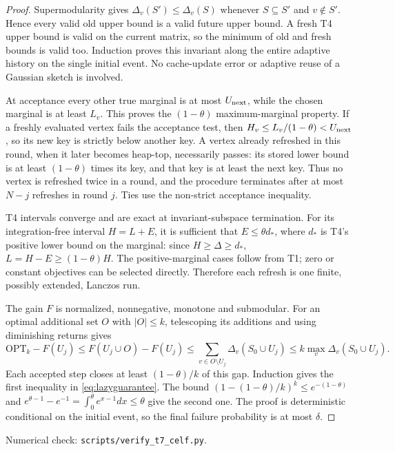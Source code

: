 \documentclass[11pt]{article}
\begin{document}
\begin{proof}
Supermodularity gives
$\Delta_v(S')\leq\Delta_v(S)$ whenever $S\subseteq S'$ and
$v\notin S'$. Hence every valid old upper bound is a valid future
upper bound. A fresh T4 upper bound is valid on the current matrix,
so the minimum of old and fresh bounds is valid too. Induction
proves this invariant along the entire adaptive history on the
single initial event. No cache-update error or adaptive reuse of a
Gaussian sketch is involved.

At acceptance every other true marginal is at most
$U_{\rm next}$, while the chosen marginal is at least $L_v$.
This proves the $(1-\theta)$ maximum-marginal property.
If a freshly evaluated vertex fails the acceptance test, then
$H_v\leq L_v/(1-\theta)<U_{\rm next}$, so its new key is strictly
below another key. A vertex already refreshed in this round, when
it later becomes heap-top, necessarily passes: its stored lower
bound is at least $(1-\theta)$ times its key, and that key is at
least the next key. Thus no vertex is refreshed twice in a round,
and the procedure terminates after at most $N-j$ refreshes in
round $j$. Ties use the non-strict acceptance inequality.

T4 intervals converge and are exact at invariant-subspace
termination. For its integration-free interval $H=L+E$, it is
sufficient that $E\leq\theta d_*$, where $d_*$ is T4's positive
lower bound on the marginal: since $H\geq\Delta\geq d_*$,
$L=H-E\geq(1-\theta)H$. The positive-marginal cases follow from
T1; zero or constant objectives can be selected directly. Therefore
each refresh is one finite, possibly extended, Lanczos run.

The gain $F$ is normalized, nonnegative, monotone and submodular.
For an optimal additional set $O$ with $|O|\leq k$, telescoping
its additions and using diminishing returns gives
\[
 \mathrm{OPT}_k-F(U_j)
 \leq F(U_j\cup O)-F(U_j)
 \leq\sum_{v\in O\setminus U_j}\Delta_v(S_0\cup U_j)
 \leq k\max_v\Delta_v(S_0\cup U_j).
\]
Each accepted step closes at least $(1-\theta)/k$ of this gap.
Induction gives the first inequality in \eqref{eq:lazyguarantee}.
The bound $(1-(1-\theta)/k)^k\leq e^{-(1-\theta)}$ and
$e^{\theta-1}-e^{-1}=\int_0^\theta e^{x-1}dx\leq\theta$ give
the second one. The proof is deterministic conditional on the
initial event, so the final failure probability is at most $\delta$.
\end{proof}
\noindent Numerical check: \texttt{scripts/verify\_t7\_celf.py}.
\end{document}
